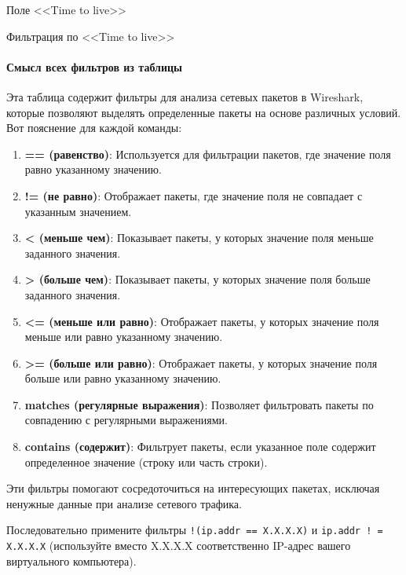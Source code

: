 \begin{image}
	\caption{Поле <<Time to live>>}
	\label{fig:wrsh:field:ttl}
\end{image}

\begin{image}
	\caption{Фильтрация по <<Time to live>>}
	\label{fig:wrsh:filter:ttl}
\end{image}

\paragraph{Смысл всех фильтров из таблицы}

Эта таблица содержит фильтры для анализа сетевых пакетов в Wireshark,
которые позволяют выделять определенные пакеты на основе различных условий.
Вот пояснение для каждой команды:

\begin{enumerate}
	\item \textbf{== (равенство)}:
		Используется для фильтрации пакетов,
		где значение поля равно указанному значению.  
	\item \textbf{!= (не равно)}:
		Отображает пакеты,
		где значение поля не совпадает с указанным значением.  
	\item \textbf{< (меньше чем)}:
		Показывает пакеты, у которых значение поля меньше заданного значения.  
	\item \textbf{> (больше чем)}:
		Показывает пакеты, у которых значение поля больше заданного значения.  
	\item \textbf{<= (меньше или равно)}:
		Отображает пакеты,
		у которых значение поля меньше или равно указанному значению.  
	\item \textbf{>= (больше или равно)}:
		Отображает пакеты,
		у которых значение поля больше или равно указанному значению.  
	\item \textbf{matches (регулярные выражения)}:
		Позволяет фильтровать пакеты по совпадению с регулярными выражениями.  
	\item \textbf{contains (содержит)}:
		Фильтрует пакеты, если указанное поле содержит определенное значение
		(строку или часть строки).  
\end{enumerate}

Эти фильтры помогают сосредоточиться на интересующих пакетах,
исключая ненужные данные при анализе сетевого трафика.

Последовательно примените фильтры \texttt{!(ip.addr == X.X.X.X)}
и \texttt{ip.addr ! = X.X.X.X}
(используйте вместо X.X.X.X соответственно
IP-адрес вашего виртуального компьютера).

